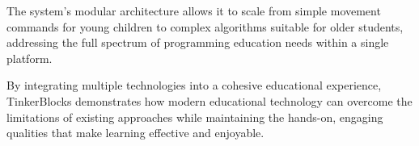 The system's modular architecture allows it to scale from simple movement commands for young children to complex algorithms suitable for older students, addressing the full spectrum of programming education needs within a single platform.

By integrating multiple technologies into a cohesive educational experience, TinkerBlocks demonstrates how modern educational technology can overcome the limitations of existing approaches while maintaining the hands-on, engaging qualities that make learning effective and enjoyable.